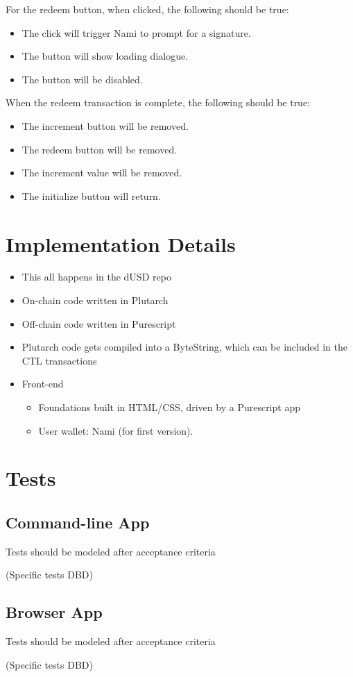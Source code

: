 \documentclass{article}
\begin{document}
For the redeem button, when clicked, the following should be true:

\begin{itemize}
  \item The click will trigger Nami to prompt for a signature.
  \item The button will show loading dialogue.
  \item The button will be disabled.
\end{itemize}

When the redeem transaction is complete, the following should be true:

\begin{itemize}
  \item The increment button will be removed.
  \item The redeem button will be removed.
  \item The increment value will be removed.
  \item The initialize button will return.
\end{itemize}


\section{Implementation Details}

\begin{itemize}
  \item This all happens in the dUSD repo
  \item On-chain code written in Plutarch
  \item Off-chain code written in Purescript
  \item Plutarch code gets compiled into a ByteString, which can be included in
    the CTL transactions
  \item Front-end
  \begin{itemize}
    \item Foundations built in HTML/CSS, driven by a Purescript app
    \item User wallet: Nami (for first version).
  \end{itemize}

\end{itemize}

\section{Tests}

\subsection{Command-line App}

Tests should be modeled after acceptance criteria

(Specific tests DBD)

\subsection{Browser App}

Tests should be modeled after acceptance criteria

(Specific tests DBD)
\end{document}

